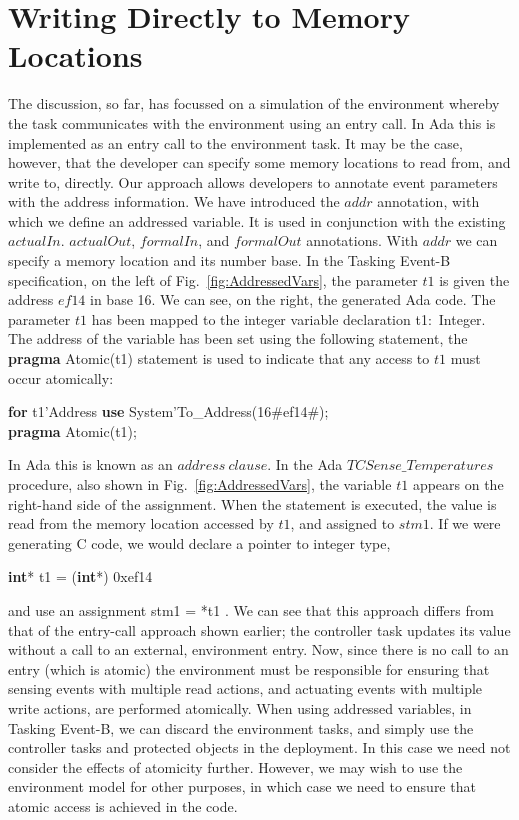 \section{Writing Directly to Memory Locations}\label{direct}
The discussion, so far, has focussed on a simulation of the environment whereby the task communicates with the environment using an entry call. In Ada this is implemented as an entry call to the environment task. It may be the case, however, that the developer can specify some memory locations to read from, and write to, directly. Our approach allows developers to annotate event parameters with the address information. We have introduced the $addr$ annotation, with which we define an addressed variable. It is used in conjunction with the existing $actualIn$. $actualOut$, $formalIn$, and $formalOut$ annotations. With $addr$ we can specify  a memory location and its number base. In the Tasking Event-B specification, on the left of Fig.~\ref{fig:AddressedVars}, the parameter $t1$ is given the address $ef14$ in base 16. We can see, on the right, the generated Ada code. The parameter $t1$ has been mapped to the integer variable declaration \sffamily t1:~Integer\rmfamily. The address of the variable has been set using the following statement, the \textbf{pragma} Atomic(t1) statement is used to indicate that any access to $t1$ must occur atomically:
\begin{center}
\begin{minipage}{\textwidth}
\begin{tabbing}
\=\textbf{for} t1'Address \textbf{use} System'To\_Address(16\#ef14\#);\\
\>\textbf{pragma} Atomic(t1);
\end{tabbing}
\end{minipage}
\end{center}
%
In Ada this is known as an $address~clause$. In the Ada $TCSense\_Temperatures$ procedure, also shown in Fig.~\ref{fig:AddressedVars}, the variable $t1$ appears on the right-hand side of the assignment. When the statement is executed, the value is read from the memory location accessed by $t1$, and assigned to $stm1$. If we were generating C code, we would declare a pointer to integer type,
\begin{center}
\begin{minipage}{0.22\textwidth}
\textbf{int}* t1 = (\textbf{int}*) 0xef14
\end{minipage}
\end{center}
and use an assignment  stm1 = *t1 . We can see that this approach differs from that of the entry-call approach shown earlier; the controller task updates its value without a call to an external, environment entry. Now, since there is no call to an entry (which is atomic) the environment must be responsible for ensuring that sensing events with multiple read actions, and actuating events with multiple write actions, are performed atomically. When using addressed variables, in Tasking Event-B, we can discard the environment tasks, and simply use the controller tasks and protected objects in the deployment. In this case we need not consider the effects of atomicity further. However, we may wish to use the environment model for other purposes,  in which case we need to ensure that atomic access is achieved in the code.
